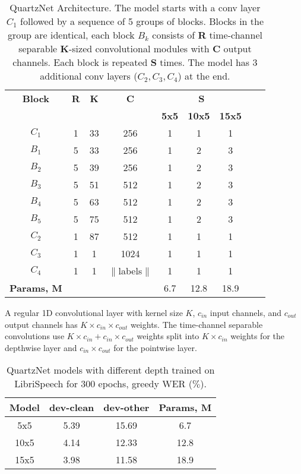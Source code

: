 \documentclass{article}
\begin{document}
\begin{table}[t]
\caption{
QuartzNet Architecture. The model starts with a conv layer $C_1$ followed by a sequence of 5 groups of blocks. Blocks in the group are identical, each block $B_k$ consists of \textbf{R} time-channel separable \textbf{K}-sized convolutional modules with \textbf{C} output channels. Each block is repeated \textbf{S} times. The model has 3 additional conv layers ($C_2, C_3, C_4$) at the end.
}
\vspace{4pt}
\label{tab:Model_Architectures}
\centering
\scalebox{1.0}
{
\begin{tabular}{c c c c c c c c c}
 \hline
   \textbf{Block} & \textbf{R} & \textbf{K} & \textbf{C}& \multicolumn{3}{c}{\textbf{S}} \\
 & & & & \textbf{5x5} & \textbf{10x5} & \textbf{15x5} \\
 \hline
 $C_1$ & 1 & 33 & 256 & 1 & 1 & 1\\
 \hline
 $B_1$ & 5 & 33 & 256 & 1 & 2 & 3\\
 $B_2$ & 5 & 39 & 256 & 1 & 2 & 3\\
 $B_3$ & 5 & 51 & 512 & 1 & 2 & 3\\
 $B_4$ & 5 & 63 & 512 & 1 & 2 & 3\\
 $B_5$ & 5 & 75 & 512 & 1 & 2 & 3\\
 \hline
 $C_2$ & 1 & 87 & 512 & 1 & 1 & 1\\
 $C_3$ & 1 & 1 & 1024 & 1 & 1 & 1\\
 $C_4$ & 1 & 1 & $\|$labels$\| $   & 1 & 1 & 1\\
 \hline
 \textbf{Params, M}& & & & 6.7 & 12.8 & 18.9\\
 \hline
\end{tabular}
}
\end{table}

A regular 1D convolutional layer with kernel size $K$, $c_{in}$ input channels, and $c_{out}$ output channels has $K \times c_{in} \times c_{out}$ weights. The time-channel separable convolutions use $K \times c_{in} + c_{in} \times c_{out}$ weights split into $K \times c_{in}$ weights for the depthwise layer and $c_{in} \times c_{out}$ for the pointwise layer.

\begin{table}[th]
\centering
\caption{QuartzNet models with different depth trained on LibriSpeech for 300 epochs, greedy WER ($\%$).}
\vspace{4pt}
\label{tab:Depth}
\scalebox{1.0}
{
\begin{tabular}{c c c c} 
 \hline
 {\textbf{Model}} & {\textbf{dev-clean}} & {\textbf{dev-other}} & {\textbf{Params, M}} \\
 \hline
 5x5 & 5.39 & 15.69 & 6.7\\ 
 10x5 & 4.14 & 12.33 &  12.8 \\ 
 15x5  & 3.98 & 11.58 & 18.9\\ 
 \hline
\end{tabular}
}
\end{table}
\end{document}
